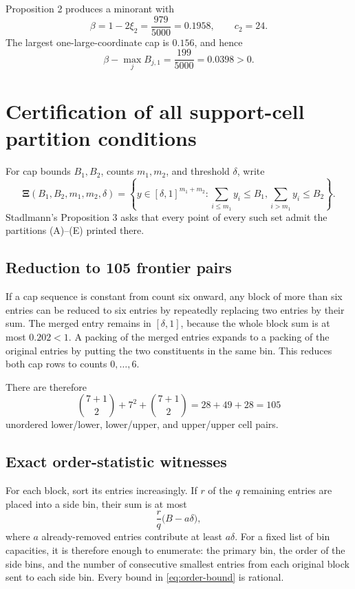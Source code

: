 \documentclass[11pt]{article}
\theoremstyle{definition}
\theoremstyle{remark}
\newcommand{\XiSet}{\boldsymbol\Xi}
\begin{document}
Proposition 2 produces a minorant with
\begin{equation}
\label{eq:beta-c2}
 \beta=1-2\xi_2=\frac{979}{5000}=0.1958,
 \qquad c_2=24.
\end{equation}
The largest one-large-coordinate cap is \(0.156\), and hence
\begin{equation}
\label{eq:beta-slack}
 \beta-\max_jB_{j,1}=\frac{199}{5000}=0.0398>0.
\end{equation}

\section{Certification of all support-cell partition conditions}
\label{sec:support-cert}

For cap bounds \(B_1,B_2\), counts \(m_1,m_2\), and threshold \(\delta\),
write
\[
 \XiSet(B_1,B_2,m_1,m_2,\delta)
 =\left\{y\in[\delta,1]^{m_1+m_2}:
 \sum_{i\leq m_1}y_i\leq B_1,
 \sum_{i>m_1}y_i\leq B_2\right\}.
\]
Stadlmann's Proposition 3 asks that every point of every such set admit the
partitions (A)--(E) printed there.

\subsection{Reduction to 105 frontier pairs}

If a cap sequence is constant from count six onward, any block of more than
six entries can be reduced to six entries by repeatedly replacing two entries
by their sum.  The merged entry remains in \([\delta,1]\), because the whole
block sum is at most \(0.202<1\).  A packing of the merged entries expands to a
packing of the original entries by putting the two constituents in the same
bin.  This reduces both cap rows to counts \(0,\ldots,6\).

There are therefore
\[
 \binom{7+1}{2}+7^2+\binom{7+1}{2}=28+49+28=105
\]
unordered lower/lower, lower/upper, and upper/upper cell pairs.

\subsection{Exact order-statistic witnesses}

For each block, sort its entries increasingly.  If \(r\) of the \(q\)
remaining entries are placed into a side bin, their sum is at most
\begin{equation}
\label{eq:order-bound}
 \frac{r}{q}\bigl(B-a\delta\bigr),
\end{equation}
where \(a\) already-removed entries contribute at least \(a\delta\).
For a fixed list of bin capacities, it is therefore enough to enumerate:
the primary bin, the order of the side bins, and the number of consecutive
smallest entries from each original block sent to each side bin.  Every bound
in \eqref{eq:order-bound} is rational.
\end{document}
